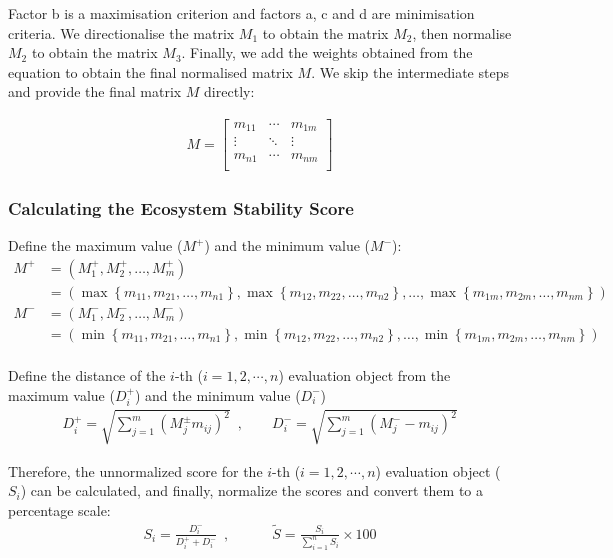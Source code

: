 \documentclass{mcmthesis}
\begin{document}
Factor b is a maximisation criterion and factors a, c and d are minimisation criteria. We directionalise the matrix $M_1$ to obtain the matrix $M_2$, then normalise $M_2$ to obtain the matrix $M_3$. Finally, we add the weights obtained from the equation to obtain the final normalised matrix $M$. We skip the intermediate steps and provide the final matrix $M$ directly:

\begin{align}
M=\left[\begin{matrix}m_{11}&\cdots&m_{1m}\\\vdots&\ddots&\vdots\\m_{n1}&\cdots&m_{nm}\\\end{matrix}\right]
\end{align}

\subsubsection{Calculating the Ecosystem Stability Score}

Define the maximum value ($M^+$) and the minimum value ($M^-$):
\begin{equation}
\begin{aligned}
M^+&=\left(M_1^+,M_2^+,\ldots,M_m^+\right)
\\
&=\left(\max{\left\{m_{11},m_{21},\ldots,m_{n1}\right\}},\max{\left\{m_{12},m_{22},\ldots,m_{n2}\right\},\ldots,\max{\left\{m_{1m},m_{2m},\ldots,m_{nm}\right\}}}\right)\\
M^-&=\left(M_1^-,M_2^-,\ldots,M_m^-\right)
\\
&=\left(\min{\left\{m_{11},m_{21},\ldots,m_{n1}\right\}},\min{\left\{m_{12},m_{22},\ldots,m_{n2}\right\},\ldots,\min{\left\{m_{1m},m_{2m},\ldots,m_{nm}\right\}}}\right)\\
\end{aligned}
\end{equation}




Define the distance of the $i$-th ($i = 1,2,\cdots, n$) evaluation object from the maximum value ($D_i^+$) and the minimum value ($D_i^-$)
\begin{align}
D_i^+=\sqrt{\sum_{j=1}^{m}\left(M_j^\pm m_{ij}\right)^2}\,\,\,, \quad\quad D_i^-=\sqrt{\sum_{j=1}^{m}\left(M_j^--m_{ij}\right)^2}
\end{align}

Therefore, the unnormalized score for the $i$-th ($i = 1,2,\cdots, n$) evaluation object ($S_i$) can be calculated, and finally, normalize the scores and convert them to a percentage scale:
\begin{align}
S_i=\frac{D_i^-}{D_i^++D_i^-}\,\,\,, \quad\quad\quad \widetilde{S}=\frac{S_i}{\sum_{i=1}^{n}S_i}\times100
\end{align}
\end{document}
